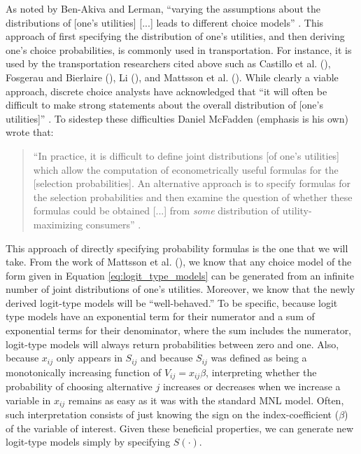 As noted by Ben-Akiva and Lerman, ``varying the assumptions about the distributions of [one's utilities] [...] leads to different choice models'' \citep[p.65]{ben-akiva_discrete_1985}. This approach of first specifying the distribution of one's utilities, and then deriving one's choice probabilities, is commonly used in transportation. For instance, it is used by the transportation researchers cited above such as Castillo et al. (\citeyear{castillo_closed_2008}), Fosgerau and Bierlaire (\citeyear{fosgerau_discrete_2009}), Li (\citeyear{li_multinomial_2011}), and Mattsson et al. (\citeyear{mattsson_extreme_2014}). While clearly a viable approach, discrete choice analysts have acknowledged that ``it will often be difficult to make strong statements about the overall distribution of [one's utilities]'' \citep[p.66]{ben-akiva_discrete_1985}. To sidestep these difficulties Daniel McFadden (emphasis is his own) wrote that: 
\begin{quotation}
``In practice, it is difficult to define joint distributions [of one's utilities] which allow the computation of econometrically useful formulas for the [selection probabilities]. An alternative approach is to specify formulas for the selection probabilities and then examine the question of whether these formulas could be obtained [...] from \textit{some} distribution of utility-maximizing consumers'' \citep[p.108]{mcfadden_conditional_1972}.
\end{quotation}
This approach of directly specifying probability formulas is the one that we will take. From the work of Mattsson et al. (\citeyear{mattsson_extreme_2014}), we know that any choice model of the form given in Equation \ref{eq:logit_type_models} can be generated from an infinite number of joint distributions of one's utilities. Moreover, we know that the newly derived logit-type models will be ``well-behaved.'' To be specific, because logit type models have an exponential term for their numerator and a sum of exponential terms for their denominator, where the sum includes the numerator, logit-type models will always return probabilities between zero and one. Also, because $x_{ij}$ only appears in $S_{ij}$ and because $S_{ij}$ was defined as being a monotonically increasing function of $V_{ij} = x_{ij} \beta$, interpreting whether the probability of choosing alternative $j$ increases or decreases when we increase a variable in $x_{ij}$ remains as easy as it was with the standard MNL model. Often, such interpretation consists of just knowing the sign on the index-coefficient ($\beta$) of the variable of interest. Given these beneficial properties, we can generate new logit-type models simply by specifying $S \left( \cdot \right)$.

